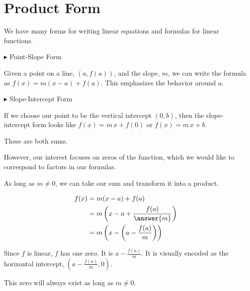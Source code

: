 \documentclass{ximera}
\begin{document}
\section{Product Form}


We have many forms for writing linear equations and formulas for linear functions.



$\blacktriangleright$ Point-Slope Form

Given a point on a line, $(a, f(a))$, and the slope, $m$, we can write the formula as $f(x) = m(x-a) + f(a)$. This emphasizes the behavior around $a$.



$\blacktriangleright$ Slope-Intercept Form

If we choose our point to be the vertical intercept $(0, b)$, then the slope-intercept form looks like $f(x) = m \, x + f(0)$ or $f(x) = m \, x + b$.



These are both sums.


However, our interest focuses on zeros of the function, which we would like to correspond to factors in our formulas.  




\begin{model}



As long as $m \ne 0$, we can take our sum and transform it into a product.




\begin{align*}
f(x) & = m(x-a) + f(a) \\
& = m \left(x - a + \frac{f(a)}{\answer{m}}\right)  \\
& = m \left(x - \left(a - \frac{f(a)}{m}\right)\right) 
\end{align*}



Since $f$ is linear, $f$ has one zero.  It is $a - \frac{f(a)}{m}$.  It is visually encoded as the horizontal intercept, $\left(a - \frac{f(a)}{m}, 0\right)$.


This zero will always exist as long as $m \ne 0$.


\end{model}
\end{document}

